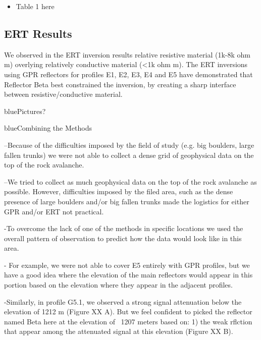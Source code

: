 \documentclass[5p]{elsarticle}
\newcommand{\COMON}{\begin{color}{blue}}
\newcommand{\COMOFF}{\end{color}}
\begin{document}
\begin{itemize}
    \item Table 1 here
\end{itemize}			   

								   
\subsection{ERT Results}

We observed  in the ERT inversion results relative resistive material (1k-8k ohm m) overlying relatively conductive material (<1k ohm m). The ERT inversions using GPR reflectors for profiles E1, E2, E3, E4 and E5 have demonstrated that Reflector Beta best constrained the inversion, by creating a sharp interface between resistive/conductive material.


\COMON Pictures? \COMOFF


\COMON Combining the Methods \COMOFF

--Because of the difficulties imposed by the field of study (e.g. big boulders,  large fallen trunks) we were not able to collect a dense grid of geophysical data on the top of the rock avalanche. 

--We tried to collect as much geophysical data on the top of the rock avalanche as possible. However, difficulties imposed by the filed area, such as the dense presence of large boulders and/or big fallen trunks made the logistics for either GPR and/or ERT not practical. 

-To overcome the lack of one of the methods in specific locations we used the overall pattern of observation to predict how the data would look like in this area. 

- For example, we were not able to cover E5 entirely with GPR profiles, but we have a good idea where the elevation of the main reflectors would appear in this portion based on the elevation where they appear in the adjacent profiles.

-Similarly, in profile G5.1, we observed a strong signal attenuation below the elevation of 1212 m (Figure XX A). But we feel confident to picked the reflector named Beta here at the elevation of ~1207 meters based on: 
1) the weak rflction that appear among the attenuated signal at this elevation (Figure XX B).
\end{document}
